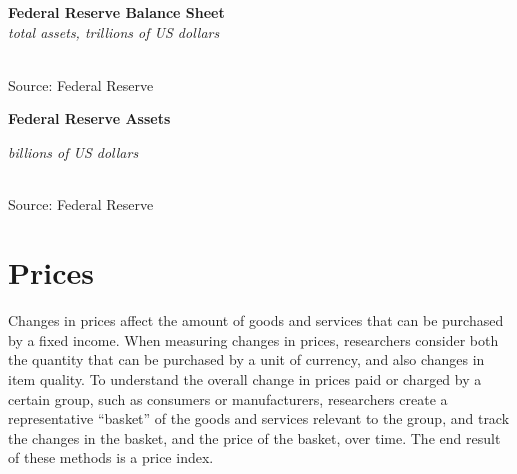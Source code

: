 \documentclass{report}
\makeatletter
\newcommand{\tbllink}[1]{\href{https://raw.githubusercontent.com/bdecon/US-chartbook/master/chartbook/data/#1}{\faTable}}
\newcommand*\short[1]{\expandafter\@gobbletwo\number\numexpr#1\relax}
\newcommand{\dateaxisticks}{
		date coordinates in=x, axis line style={draw=none},
		xmax={2023-02-15},
		max space between ticks=40,	    
		xtick={{1990-01-01}, {1992-01-01}, {1994-01-01}, 
			{1996-01-01}, {1998-01-01}, {2000-01-01}, 
			{2002-01-01}, {2004-01-01}, {2006-01-01},
			{2008-01-01}, {2010-01-01}, {2012-01-01}, {2014-01-01},
		    {2016-01-01}, {2018-01-01}, {2020-01-01}, {2022-01-01}, 
		    {2024-01-01}, {2026-01-01}},
		minor xtick={{1989-01-01}, {1991-01-01}, {1993-01-01},
			{1995-01-01}, {1997-01-01}, {1999-01-01}, 
			{2001-01-01}, {2003-01-01}, {2005-01-01}, {2007-01-01},
		    {2009-01-01}, {2011-01-01}, {2013-01-01}, {2015-01-01},
		    {2017-01-01}, {2019-01-01}, {2021-01-01}, {2023-01-01}, 
		    {2025-01-01}, {2027-01-01}},
		enlarge y limits={0.06}, enlarge x limits={0.01},
		}
\newcommand{\bbar}[2]{extra #1 ticks = {{#2}}, extra #1 tick labels = ,
		extra #1 tick style = {grid=major, grid style={thick, black!25}},}
\newcommand{\stdline}[4]{\addplot[very thick, no markers, color=#1] 
		table [x=#2, y=#3, col sep=comma] {#4};	}
\newcommand{\recbars}{
		\fill[color=black!10] (axis cs:{2007-12-01},\pgfkeysvalueof{/pgfplots/ymin}) rectangle 
			(axis cs:{2009-07-01}, \pgfkeysvalueof{/pgfplots/ymax});
		\fill[color=black!10] (axis cs:{2020-02-01},\pgfkeysvalueof{/pgfplots/ymin}) rectangle 
			(axis cs:{2020-05-01}, \pgfkeysvalueof{/pgfplots/ymax});}
\makeatother
\begin{document}
{\begin{minipage}{0.44\textwidth}
\normalsize \textbf{Federal Reserve Balance Sheet}\\
\footnotesize{\textit{total assets, trillions of US dollars}}\\
\hspace*{-2mm} \\
\footnotesize{Source: Federal Reserve} \hfill \tbllink{fed_assets.csv}
\end{minipage}\hspace{7mm}
\begin{minipage}{0.27\textwidth}
\small 
\end{minipage}
\vspace{8mm}

\begin{minipage}{0.76\textwidth}
\normalsize \textbf{Federal Reserve Assets}\\
\footnotesize{\textit{billions of US dollars}\\
 \setlength{\tabcolsep}{3.1pt} \color{black!90}
{\renewcommand{\arraystretch}{1.54}
	\begin{tabular}{p{40mm} R{13.0mm} R{13.0mm} R{13.0mm} R{13.0mm} R{13.0mm}}
		 \hline
	\end{tabular}
}}
		
\vspace{-2mm}
\footnotesize{Source: Federal Reserve}
\end{minipage}
\newpage
\hypertarget{pr}{}
\section*{Prices}
\begin{minipage}{0.76\textwidth}
\small Changes in prices affect the amount of goods and services that can be purchased by a fixed income. When measuring changes in prices, researchers consider both the quantity that can be purchased by a unit of currency, and also changes in item quality. To understand the overall change in prices paid or charged by a certain group, such as consumers or manufacturers, researchers create a representative ``basket'' of the goods and services relevant to the group, and track the changes in the basket, and the price of the basket, over time. The end result of these methods is a price index.


\end{minipage}}
\end{document}
